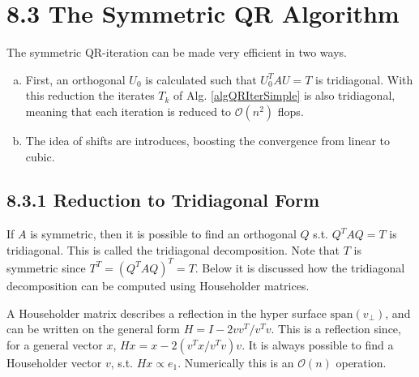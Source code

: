 \section*{8.3 The Symmetric QR Algorithm} %

The symmetric QR-iteration can be made very efficient in two ways.
\begin{enumerate}[(a):]
	\item First, an orthogonal $U_0$ is calculated such that $U_0^T A U = T$ is tridiagonal.
	With this reduction the iterates $T_k$ of Alg. \ref{algQRIterSimple} is also tridiagonal,
	meaning that each iteration is reduced to $\mathcal O(n^2)$ flops.
	\item The idea of shifts are introduces, boosting the convergence from linear to cubic.
\end{enumerate} 

\subsection*{8.3.1 Reduction to Tridiagonal Form}%

If $A$ is symmetric, then it is possible to find an orthogonal $Q$ s.t. $Q^TAQ=T$ is tridiagonal.
This is called the tridiagonal decomposition. Note that $T$ is symmetric since
$T^T = (Q^TAQ)^T = T$.
Below it is discussed how the tridiagonal decomposition can be computed using Householder matrices.

A Householder matrix describes a reflection in the hyper surface $\text{span}(v_\bot)$, and can be 
written on the general form $H = I - 2{vv^T}/{v^Tv}$. This is a reflection since, for a general 
vector $x$, $Hx=x - 2({v^Tx}/{v^Tv})v$. It is always possible to find a Householder vector $v$, s.t. 
$Hx\propto e_1$. Numerically this is an $\mathcal O(n)$ operation.

